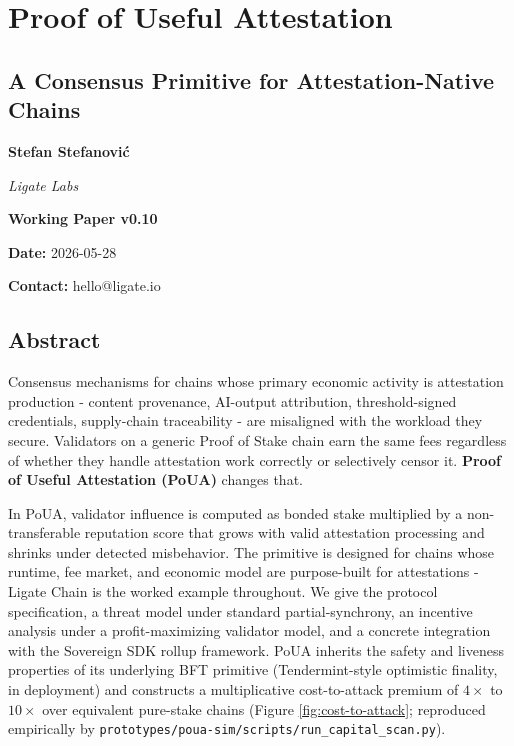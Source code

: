 \documentclass[
  11pt,
]{article}
\author{}
\date{}
\begin{document}
\section{Proof of Useful Attestation}\label{proof-of-useful-attestation}

\subsection{A Consensus Primitive for Attestation-Native
Chains}\label{a-consensus-primitive-for-attestation-native-chains}

\textbf{Stefan Stefanović}

\emph{Ligate Labs}

\textbf{Working Paper v0.10}

\textbf{Date:} 2026-05-28

\textbf{Contact:} hello@ligate.io

\newpage

\tableofcontents

\newpage

\subsection{Abstract}\label{abstract}

Consensus mechanisms for chains whose primary economic activity is
attestation production - content provenance, AI-output attribution,
threshold-signed credentials, supply-chain traceability - are misaligned
with the workload they secure. Validators on a generic Proof of Stake
chain earn the same fees regardless of whether they handle attestation
work correctly or selectively censor it. \textbf{Proof of Useful
Attestation (PoUA)} changes that.

In PoUA, validator influence is computed as bonded stake multiplied by a
non-transferable reputation score that grows with valid attestation
processing and shrinks under detected misbehavior. The primitive is
designed for chains whose runtime, fee market, and economic model are
purpose-built for attestations - Ligate Chain is the worked example
throughout. We give the protocol specification, a threat model under
standard partial-synchrony, an incentive analysis under a
profit-maximizing validator model, and a concrete integration with the
Sovereign SDK rollup framework. PoUA inherits the safety and liveness
properties of its underlying BFT primitive (Tendermint-style optimistic
finality, in deployment) and constructs a multiplicative cost-to-attack
premium of \(4\times\) to \(10\times\) over equivalent pure-stake chains
(Figure \ref{fig:cost-to-attack}; reproduced empirically by
\texttt{prototypes/poua-sim/scripts/run\_capital\_scan.py}).
\end{document}
